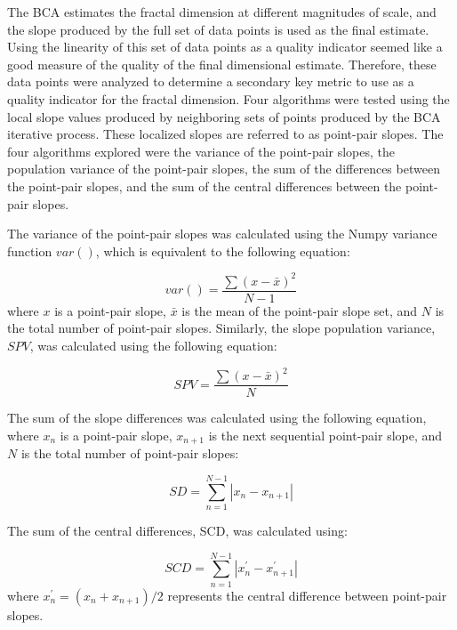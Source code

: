 \documentclass[12pt, oneside]{book}
\begin{document}
The BCA estimates the fractal dimension at different magnitudes of scale, and the slope produced by the full set of data points is used as the final estimate.  Using the linearity of this set of data points as a quality indicator seemed like a good measure of the quality of the final dimensional estimate.  Therefore, these data points were analyzed to determine a secondary key metric to use as a quality indicator for the fractal dimension.  Four algorithms were tested using the local slope values produced by neighboring sets of points produced by the BCA iterative process.  These localized slopes are referred to as point-pair slopes.  The four algorithms explored were the variance of the point-pair slopes, the population variance of the point-pair slopes, the sum of the differences between the point-pair slopes, and the sum of the central differences between the point-pair slopes.

The variance of the point-pair slopes was calculated using the Numpy variance function \(var()\), which is equivalent to the following equation:

\begin{equation} \tag{9}
var() = \frac{\sum{(x-\bar{x})^{2}}}{N-1}
\end{equation}
where \(x\) is a point-pair slope, \(\bar{x}\) is the mean of the point-pair slope set, and \(N\) is the total number of point-pair slopes.  Similarly, the slope population variance, \(SPV\), was calculated using the following equation:

\begin{equation} \tag{10}
SPV = \frac{\sum{(x-\bar{x})^{2}}}{N}
\end{equation}

The sum of the slope differences was calculated using the following equation, where \(x_{n}\) is a point-pair slope, \(x_{n+1}\) is the next sequential point-pair slope, and \(N\) is the total number of point-pair slopes: 

\begin{equation} \tag{11}
SD = \sum_{n=1}^{N-1}|x_{n} - x_{n+1}|
\end{equation}

The sum of the central differences, SCD, was calculated using:

\begin{equation} \tag{12}
SCD = \sum_{n=1}^{N-1}|x_{n}^{'} - x_{n+1}^{'}|
\end{equation}
where \(x_{n}^{'} = (x_{n} + x_{n+1})/2\) represents the central difference between point-pair slopes.
\end{document}
